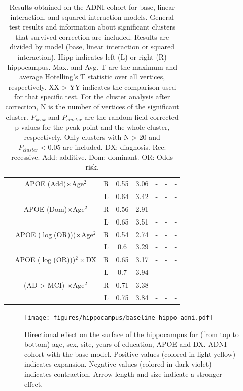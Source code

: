 \begin{table}[htbp]
{\begin{tabular}{@{}c|c||ccc||ccc@{}}
&  APOE (Add)$\times$Age$^2$ &    R &   0.55 &   3.06 &  - & - & - \\ 
&                         &    L &    0.64 &   3.42  &  - & - & - \\ 
& APOE (Dom)$\times$Age$^2$ &    R &   0.56 &   2.91   &  - & - & - \\ 
&                        &    L &    0.65 &   3.51 & - & - & - \\ 
& APOE ($\log$(OR)))$\times$Age$^2$ &    R & 0.54 & 2.74 &  - & - & - \\ 
&                        &    L & 0.6  & 3.29  & - & - & - \\ 
& APOE ($\log$(OR)))$^2\times$DX &  R & 0.65 & 3.17 &  - & - & - \\ 
&                        &    L & 0.7  & 3.94 & - & - & - \\ 
& (AD > MCI) $\times$Age$^2$ &    R &   0.71 &  3.38   &  - & - & - \\ 
&                          &    L &    0.75 &   3.84 & - &  - & - \\  \bottomrule
 \bottomrule
\end{tabular}}
\caption[Results obtained on the ADNI cohort for base, linear interaction, and squared interaction models.]{Results obtained on the ADNI cohort for base, linear interaction, and squared interaction models. General test results and information about significant clusters that survived correction are included. Results are divided by model (base, linear interaction or squared interaction). Hipp indicates left (L) or right (R) hippocampus. Max. and Avg. T are the maximum and average Hotelling's T statistic over all vertices, respectively. XX > YY indicates the comparison used for that specific test. For the cluster analysis after correction, N is the number of vertices of the significant cluster. $P_{peak}$ and $P_{cluster}$ are the random field corrected p-values for the peak point and the whole cluster, respectively. Only  clusters with N > 20 and $P_{cluster} < 0.05$ are included. DX: diagnosis. Rec: recessive. Add: additive. Dom: dominant. OR: Odds risk.}\label{table:fullADNItable}
\end{table}

\begin{figure}[htbp]
  \centering
  \texttt{[image: figures/hippocampus/baseline\_hippo\_adni.pdf]}
  \caption[Directional effect on the surface of the hippocampus, ADNI cohort.]{Directional effect on the surface of the hippocampus for (from top to bottom) age, sex, site, years of education, APOE and DX. ADNI cohort with the base model. Positive values (colored in light yellow) indicates expansion. Negative values (colored in dark violet) indicates contraction. Arrow length and size indicate a stronger effect.}\label{fig:adnibaselinefig1}
\end{figure}

